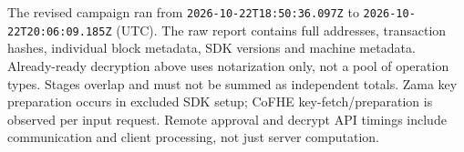 The revised campaign ran from \texttt{2026-10-22T18:50:36.097Z} to \texttt{2026-10-22T20:06:09.185Z} (UTC).
The raw report contains full addresses, transaction hashes, individual block metadata, SDK versions and machine metadata.
Already-ready decryption above uses notarization only, not a pool of operation types. Stages overlap and must not be summed as independent totals.
Zama key preparation occurs in excluded SDK setup; CoFHE key-fetch/preparation is observed per input request. Remote approval and decrypt API timings include communication and client processing, not just server computation.
